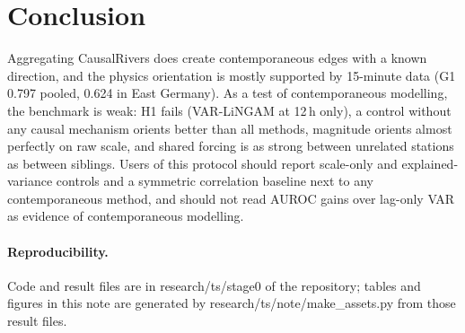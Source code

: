\documentclass[10pt,a4paper]{article}
\begin{document}
\section{Conclusion}
Aggregating CausalRivers does create contemporaneous edges with a known direction, and the physics orientation is mostly supported by 15-minute data (G1 0.797 pooled, 0.624 in East Germany). As a test of contemporaneous modelling, the benchmark is weak: H1 fails (VAR-LiNGAM at 12\,h only), a control without any causal mechanism orients better than all methods, magnitude orients almost perfectly on raw scale, and shared forcing is as strong between unrelated stations as between siblings. Users of this protocol should report scale-only and explained-variance controls and a symmetric correlation baseline next to any contemporaneous method, and should not read AUROC gains over lag-only VAR as evidence of contemporaneous modelling.

\paragraph{Reproducibility.}
Code and result files are in research/ts/stage0 of the repository; tables and figures in this note are generated by research/ts/note/make\_assets.py from those result files.



\end{document}
